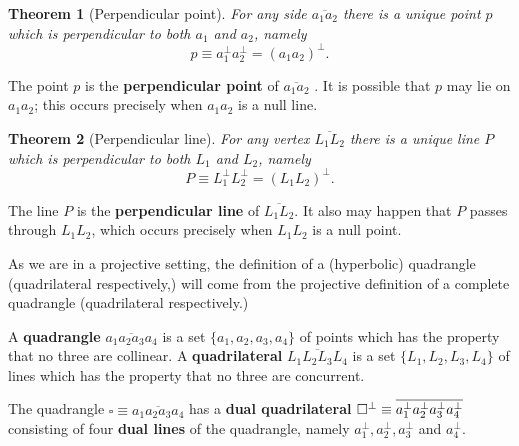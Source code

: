 \documentclass[11pt]{article}
\newtheorem{theorem}{Theorem}
\begin{document}
\begin{theorem}[Perpendicular point]
For any side $\overline{a_{1}a_{2}}$ there is a unique point $p$ which is
perpendicular to both $a_{1}$ and $a_{2}$, namely 
\begin{equation*}
p\equiv a_{1}^{\perp}a_{2}^{\perp}=(a_{1}a_{2})^{\perp}.
\end{equation*}
\end{theorem}

The point $p$ is the \textbf{perpendicular point} of $\overline{a_{1}a_{2}}$%
. It is possible that $p$ may lie on $a_{1}a_{2}$; this occurs precisely
when $a_{1}a_{2}$ is a null line.\newline

\begin{theorem}[Perpendicular line]
For any vertex $\overline{L_{1}L_{2}}$ there is a unique line $P$ which is
perpendicular to both $L_{1}$ and $L_{2}$, namely 
\begin{equation*}
P\equiv L_{1}^{\perp}L_{2}^{\perp}=(L_{1}L_{2})^{\perp}.
\end{equation*}
\end{theorem}

The line $P$ is the \textbf{perpendicular line} of $\overline{L_{1}L_{2}}$.
It also may happen that $P$ passes through $L_{1}L_{2}$, which occurs
precisely when $L_{1}L_{2}$ is a null point.\newline

\pagebreak

As we are in a projective setting, the definition of a (hyperbolic)
quadrangle (quadrilateral respectively,) will come from the projective
definition of a complete quadrangle (quadrilateral respectively.)\newline

A \textbf{quadrangle} $\overline{a_{1}a_{2}a_{3}a_{4}}$ is a set $%
\{a_{1},a_{2},a_{3},a_{4}\}$ of points which has the property that no three
are collinear. A \textbf{quadrilateral} $\overline{L_{1}L_{2}L_{3}L_{4}}$ is
a set $\{L_{1},L_{2},L_{3},L_{4}\}$ of lines which has the property that no
three are concurrent.\newline

The quadrangle $\square\equiv \overline{a_{1}a_{2}a_{3}a_{4}}$ has a \textbf{%
dual quadrilateral} $\square^{\perp}\equiv\overline{a_{1}^{\perp}a_{2}^{%
\perp}a_{3}^{\perp}a_{4}^{\perp}}$ consisting of four \textbf{dual lines} of
the quadrangle, namely $a_{1}^{\perp},a_{2}^{\perp},a_{3}^{\perp}$ and $%
a_{4}^{\perp}$.\newline
\end{document}
